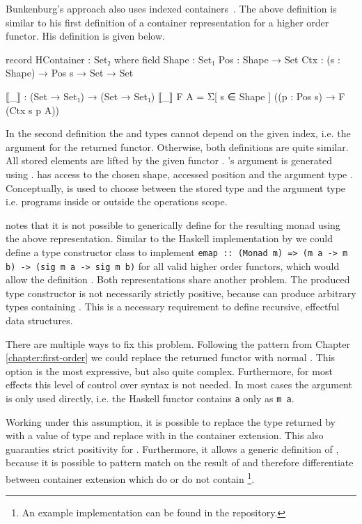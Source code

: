Bunkenburg's approach also uses indexed containers~\cite{bunkenburg2019modeling}.
The above definition is similar to his first definition of a container
representation for a higher order functor.
His definition is given below.
\begin{code}
record HContainer : Set₂ where
  field
    Shape : Set₁
    Pos : Shape → Set
    Ctx : (s : Shape) → Pos s → Set → Set

  ⟦_⟧ : (Set → Set₁) → (Set → Set₁)
  ⟦_⟧ F A = Σ[ s ∈ Shape ] ((p : Pos s) → F (Ctx s p A))
\end{code}
In the second definition the  and  types cannot
depend on the given index, i.e. the argument for the returned functor.
Otherwise, both definitions are quite similar.
All stored elements are lifted by the given functor .
's argument is generated using .
 has access to the chosen shape, accessed position and the 
argument type .
Conceptually,  is used to choose between the stored type
 and the argument type  i.e. programs inside or
outside the operations scope.

\textcite{bunkenburg2019modeling} notes that it is not possible to generically
define \AgdaFunction{>>=} for the resulting monad using the above
representation.
Similar to the Haskell implementation by \textcite{DBLP:conf/haskell/WuSH14} we
could define a type constructor class to implement
\texttt{emap :: (Monad m) => (m a -> m b) -> (sig m a
-> sig m b)}
for all valid higher order functors, which would allow the definition
\AgdaFunction{>>=}.
Both representations share another problem.
The produced type constructor is not necessarily strictly positive, because
 can produce arbitrary types containing .
This is a necessary requirement to define recursive, effectful data structures.

There are multiple ways to fix this problem.
Following the pattern from Chapter \ref{chapter:first-order} we could replace
the returned functor with normal .
This option is the most expressive, but also quite complex.
Furthermore, for most effects this level of control over syntax is not needed.
In most cases the argument  is only used directly, i.e. the
Haskell functor contains \texttt{a} only as \texttt{m a}.

Working under this assumption, it is possible to replace the type returned by
 with a value of type
\AgdaSpace{} and replace
 with  in the container
extension.
This also guaranties strict positivity for .
Furthermore, it allows a generic definition of \AgdaFunction{>>=}, because it is
possible to pattern match on the result of  and therefore
differentiate between container extension which do or do not contain
\footnote{An example implementation can be found in the
  repository.}.
 
